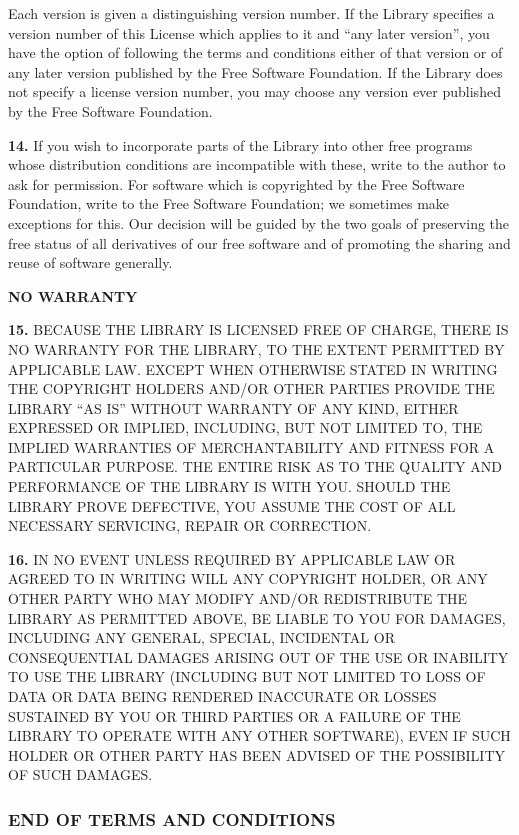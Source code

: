 \documentclass[]{article}
\begin{document}
Each version is given a distinguishing version number. If the Library
specifies a version number of this License which applies to it and ``any
later version'', you have the option of following the terms and
conditions either of that version or of any later version published by
the Free Software Foundation. If the Library does not specify a license
version number, you may choose any version ever published by the Free
Software Foundation.

\textbf{14.} If you wish to incorporate parts of the Library into other
free programs whose distribution conditions are incompatible with these,
write to the author to ask for permission. For software which is
copyrighted by the Free Software Foundation, write to the Free Software
Foundation; we sometimes make exceptions for this. Our decision will be
guided by the two goals of preserving the free status of all derivatives
of our free software and of promoting the sharing and reuse of software
generally.

\textbf{NO WARRANTY}

\textbf{15.} BECAUSE THE LIBRARY IS LICENSED FREE OF CHARGE, THERE IS NO
WARRANTY FOR THE LIBRARY, TO THE EXTENT PERMITTED BY APPLICABLE LAW.
EXCEPT WHEN OTHERWISE STATED IN WRITING THE COPYRIGHT HOLDERS AND/OR
OTHER PARTIES PROVIDE THE LIBRARY ``AS IS'' WITHOUT WARRANTY OF ANY
KIND, EITHER EXPRESSED OR IMPLIED, INCLUDING, BUT NOT LIMITED TO, THE
IMPLIED WARRANTIES OF MERCHANTABILITY AND FITNESS FOR A PARTICULAR
PURPOSE. THE ENTIRE RISK AS TO THE QUALITY AND PERFORMANCE OF THE
LIBRARY IS WITH YOU. SHOULD THE LIBRARY PROVE DEFECTIVE, YOU ASSUME THE
COST OF ALL NECESSARY SERVICING, REPAIR OR CORRECTION.

\textbf{16.} IN NO EVENT UNLESS REQUIRED BY APPLICABLE LAW OR AGREED TO
IN WRITING WILL ANY COPYRIGHT HOLDER, OR ANY OTHER PARTY WHO MAY MODIFY
AND/OR REDISTRIBUTE THE LIBRARY AS PERMITTED ABOVE, BE LIABLE TO YOU FOR
DAMAGES, INCLUDING ANY GENERAL, SPECIAL, INCIDENTAL OR CONSEQUENTIAL
DAMAGES ARISING OUT OF THE USE OR INABILITY TO USE THE LIBRARY
(INCLUDING BUT NOT LIMITED TO LOSS OF DATA OR DATA BEING RENDERED
INACCURATE OR LOSSES SUSTAINED BY YOU OR THIRD PARTIES OR A FAILURE OF
THE LIBRARY TO OPERATE WITH ANY OTHER SOFTWARE), EVEN IF SUCH HOLDER OR
OTHER PARTY HAS BEEN ADVISED OF THE POSSIBILITY OF SUCH DAMAGES.

\subsubsection{END OF TERMS AND CONDITIONS}
\end{document}
